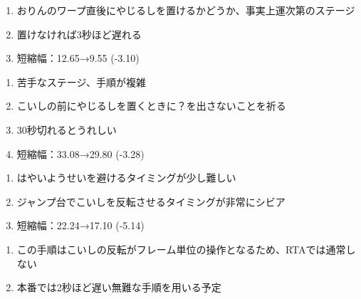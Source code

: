 \clearpage
\begin{enumerate}[label={\sarrow}]
\item おりんのワープ直後にやじるしを置けるかどうか、事実上運次第のステージ
\item 置けなければ3秒ほど遅れる
\item 短縮幅：12.65→9.55 (-3.10)
\end{enumerate}



\begin{enumerate}[label={\sarrow}]
\item 苦手なステージ、手順が複雑
\item こいしの前にやじるしを置くときに？\hspace{0pt}を出さないことを祈る
\item 30秒切れるとうれしい
\item 短縮幅：33.08→29.80 (-3.28)
\end{enumerate}



\begin{enumerate}[label={\sarrow}]
\item はやいようせいを避けるタイミングが少し難しい
\item ジャンプ台でこいしを反転させるタイミングが非常にシビア
\item 短縮幅：22.24→17.10 (-5.14)
\end{enumerate}
\begin{marker}
\begin{enumerate}[label={\sarrow}]
\item この手順はこいしの反転がフレーム単位の操作となるため、RTAでは通常しない
\item 本番では2秒ほど遅い無難な手順を用いる予定
\end{enumerate}
\end{marker}


